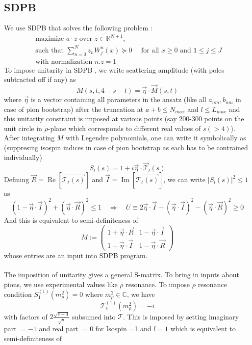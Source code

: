 ﻿\documentclass[12pt,a4paper]{article}
\begin{document}
\subsection{SDPB}
We use SDPB that solves the following problem \cite{3}:
$$
\begin{array}{l}
\text { maximize } a \cdot z \text { over } z \in \mathbb{R}^{N+1},\\
\text { such that } \sum_{n=0}^{N} z_{n} W_{j}^{n}(x) \succeq 0 \quad \text { for all } x \geq 0 \text { and } 1 \leq j \leq J\\
\text{ with normalization }n.z=1
\end{array}
$$
To impose unitarity in SDPB \cite{5}, we write scattering amplitude (with poles subtracted off if any) as
$$
M(s, t, 4-s-t)=\vec{\eta} \cdot \vec{M}(s, t)
$$
where $\vec{\eta}$ is a vector containing all parameters in the ansatz (like all $a_{n m}, b_{n m}$ in case of pion bootstrap) after the truncation at $a+b \leq N_{max}$ and $l \leq L_{max}$ and this unitarity constraint is imposed at various points (say 200-300 points on the unit circle in $\rho$-plane which corresponds to different real values of $s(>4)$). After integrating $M$ with Legendre polynomials, one can write it symbolically as (suppresing isospin indices in case of pion bootstrap as each has to be contrained individually)
$$
S_{l}(s)=1+\iota \vec{\eta} \cdot \vec{\mathcal{T}}_{l}(s)
$$
Defining $\vec{R}=\operatorname{Re}\left[\vec{\mathcal{T}_{\ell}(s)}\right]$ and $\vec{I}=\operatorname{Im}\left[\vec{\mathcal{T}_{\ell}(s)}\right]$, we can write $|S_{l}(s)|^{2}\leq 1$ as
$$(1-\vec{\eta} \cdot \vec{I})^{2}+(\vec{\eta} \cdot \vec{R})^{2} \leq 1 \quad \Rightarrow \quad U \equiv 2 \vec{\eta} \cdot \vec{I}-(\vec{\eta} \cdot \vec{I})^{2}-(\vec{\eta} \cdot \vec{R})^{2} \geq 0$$
And this is equivalent to semi-definiteness of 
$$
M:=\left(\begin{array}{cc}
1+\vec{\eta} \cdot \vec{R} & 1-\vec{\eta} \cdot \vec{I} \\
1-\vec{\eta} \cdot \vec{I} & 1-\vec{\eta} \cdot \vec{R}
\end{array}\right)
$$
whose entries are an input into SDPB program. \\\\
The imposition of unitarity gives a general S-matrix. To bring in inputs about pions, we use experimental values like $\rho$ resonance. To impose $\rho$ resonance condition $S_{1}^{(1)}\left(m_{\rho}^{2}\right)=0$ where $m_{\rho}^{2} \in \mathbb{C}$, we have 
$$\mathcal{T}_{1}^{(1)}\left(m_{\rho}^{2}\right)=-i$$
with factors of $2 \frac{\sqrt{s-4}}{\sqrt{s}}$ subsumed into $\mathcal{T}$. This is imposed by setting imaginary part $=-1$ and real part $=0$ for Isospin =1 and $l=1$ which is equivalent to semi-definiteness of
\end{document}
